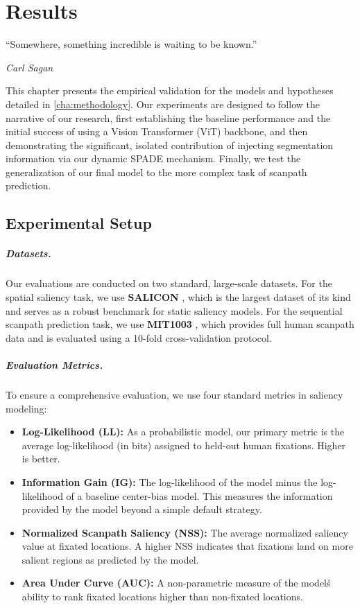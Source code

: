 \chapter{Results}
\label{c:results}

\epigraph{\enquote{Somewhere, something incredible is waiting to be known.}}{\emph{Carl Sagan}}

This chapter presents the empirical validation for the models and hypotheses detailed in \cref{cha:methodology}. Our experiments are designed to follow the narrative of our research, first establishing the baseline performance and the initial success of using a Vision Transformer (ViT) backbone, and then demonstrating the significant, isolated contribution of injecting segmentation information via our dynamic SPADE mechanism. Finally, we test the generalization of our final model to the more complex task of scanpath prediction.

\section{Experimental Setup}
\label{sec:results_setup}

\paragraph{Datasets.} Our evaluations are conducted on two standard, large-scale datasets. For the spatial saliency task, we use \textbf{SALICON} \cite{jiang2015salicon}, which is the largest dataset of its kind and serves as a robust benchmark for static saliency models. For the sequential scanpath prediction task, we use \textbf{MIT1003} \cite{judd2009learning}, which provides full human scanpath data and is evaluated using a 10-fold cross-validation protocol.

\paragraph{Evaluation Metrics.} To ensure a comprehensive evaluation, we use four standard metrics in saliency modeling:
\begin{itemize}
    \item \textbf{Log-Likelihood (LL):} As a probabilistic model, our primary metric is the average log-likelihood (in bits) assigned to held-out human fixations. Higher is better.
    \item \textbf{Information Gain (IG):} The log-likelihood of the model minus the log-likelihood of a baseline center-bias model. This measures the information provided by the model beyond a simple default strategy.
    \item \textbf{Normalized Scanpath Saliency (NSS):} The average normalized saliency value at fixated locations. A higher NSS indicates that fixations land on more salient regions as predicted by the model.
    \item \textbf{Area Under Curve (AUC):} A non-parametric measure of the model\'s ability to rank fixated locations higher than non-fixated locations.
\end{itemize}

